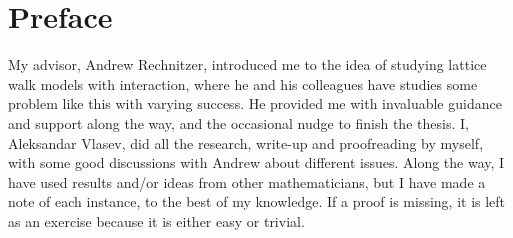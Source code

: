 
\chapter{Preface}


My advisor, Andrew Rechnitzer, introduced me to the idea of studying lattice walk models with interaction, where he and his colleagues have studies some problem like this with varying success. He provided me with invaluable guidance and support along the way, and the occasional nudge to finish the thesis. I, Aleksandar Vlasev, did all the research, write-up and proofreading by myself, with some good discussions with Andrew about different issues. Along the way, I have used results and/or ideas from other mathematicians, but I have made a note of each instance, to the best of my knowledge. If a proof is missing, it is left as an exercise because it is either easy or trivial.

